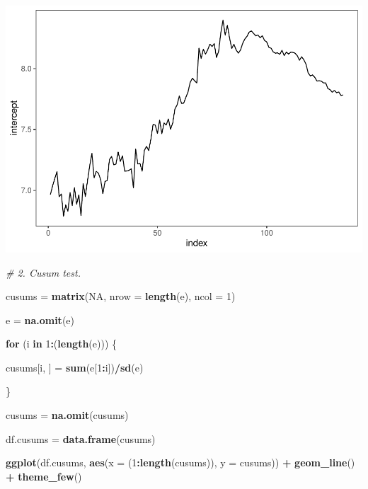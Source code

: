 \documentclass[11pt, a4paper]{report}
\newenvironment{Shaded}{\begin{snugshade}}{\end{snugshade}}
\newcommand{\CommentTok}[1]{\textcolor[rgb]{0.56,0.35,0.01}{\textit{#1}}}
\newcommand{\ControlFlowTok}[1]{\textcolor[rgb]{0.13,0.29,0.53}{\textbf{#1}}}
\newcommand{\DataTypeTok}[1]{\textcolor[rgb]{0.13,0.29,0.53}{#1}}
\newcommand{\DecValTok}[1]{\textcolor[rgb]{0.00,0.00,0.81}{#1}}
\newcommand{\KeywordTok}[1]{\textcolor[rgb]{0.13,0.29,0.53}{\textbf{#1}}}
\newcommand{\NormalTok}[1]{#1}
\newcommand{\OperatorTok}[1]{\textcolor[rgb]{0.81,0.36,0.00}{\textbf{#1}}}
\newcommand{\OtherTok}[1]{\textcolor[rgb]{0.56,0.35,0.01}{#1}}
\newcommand{\StringTok}[1]{\textcolor[rgb]{0.31,0.60,0.02}{#1}}
\theoremstyle{plain}
\theoremstyle{plain}
\theoremstyle{remark}
\begin{document}
\begin{center}\includegraphics{Econo2_P7_files/figure-latex/all-3} \end{center}

\begin{Shaded}
\begin{Highlighting}[]
\CommentTok{# 2. Cusum test.}

\NormalTok{cusums =}\StringTok{ }\KeywordTok{matrix}\NormalTok{(}\OtherTok{NA}\NormalTok{, }\DataTypeTok{nrow =} \KeywordTok{length}\NormalTok{(e), }\DataTypeTok{ncol =} \DecValTok{1}\NormalTok{)}

\NormalTok{e =}\StringTok{ }\KeywordTok{na.omit}\NormalTok{(e)}

\ControlFlowTok{for}\NormalTok{ (i }\ControlFlowTok{in} \DecValTok{1}\OperatorTok{:}\NormalTok{(}\KeywordTok{length}\NormalTok{(e))) \{}
    
\NormalTok{    cusums[i, ] =}\StringTok{ }\KeywordTok{sum}\NormalTok{(e[}\DecValTok{1}\OperatorTok{:}\NormalTok{i])}\OperatorTok{/}\KeywordTok{sd}\NormalTok{(e)}
    
\NormalTok{\}}


\NormalTok{cusums =}\StringTok{ }\KeywordTok{na.omit}\NormalTok{(cusums)}

\NormalTok{df.cusums =}\StringTok{ }\KeywordTok{data.frame}\NormalTok{(cusums)}

\KeywordTok{ggplot}\NormalTok{(df.cusums, }\KeywordTok{aes}\NormalTok{(}\DataTypeTok{x =}\NormalTok{ (}\DecValTok{1}\OperatorTok{:}\KeywordTok{length}\NormalTok{(cusums)), }\DataTypeTok{y =}\NormalTok{ cusums)) }\OperatorTok{+}\StringTok{ }
\StringTok{    }\KeywordTok{geom_line}\NormalTok{() }\OperatorTok{+}\StringTok{ }\KeywordTok{theme_few}\NormalTok{()}
\end{Highlighting}
\end{Shaded}
\end{document}
